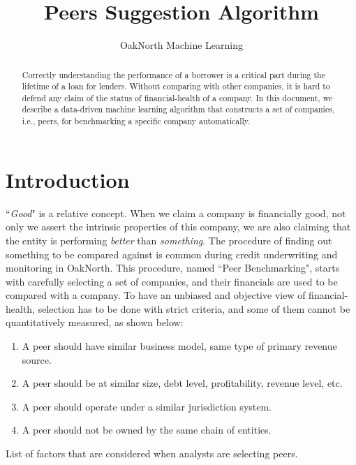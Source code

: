 \documentclass[]{article}
\title{Peers Suggestion Algorithm}
\author{OakNorth Machine Learning}
\begin{document}
\maketitle

\begin{abstract}
Correctly understanding the performance of a borrower is a critical part during 
the lifetime of a loan for lenders. Without comparing with other companies, it 
is hard to defend any claim of the status of financial-health of a company. In 
this document, we describe a data-driven machine learning algorithm that 
constructs a set of companies, i.e., peers, for benchmarking a specific 
company automatically. 
\end{abstract}

\section{Introduction}

``\textit{Good}" is a relative concept. When we claim a company is financially  
good, not only we assert the intrinsic properties of this company, 
we are also claiming that the entity is performing \textit{better} than 
\textit{something}. The procedure of finding out something to be compared 
against is common during credit underwriting and monitoring in OakNorth. This 
procedure, named ``Peer Benchmarking", starts with carefully selecting a set of 
companies, and their financials are used to be compared with a company. To
have an unbiased and objective view of financial-health, selection has to be 
done with strict criteria, and some of them cannot be quantitatively measured, 
as shown below:
\begin{mylist}
    \begin{enumerate}
        \item A peer should have similar business model, same type of primary 
        revenue source. 
        \item A peer should be at similar size, debt level, profitability, 
        revenue 
        level, etc.
        \item A peer should operate under a similar jurisdiction system.
        \item A peer should not be owned by the same chain of entities.
        
    \end{enumerate}
    \caption{List of factors that are considered when analysts are 
    selecting peers.\label{list:req}}
\end{mylist}
\end{document}
